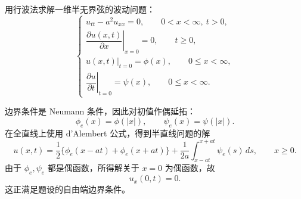 \begin{question}
用行波法求解一维半无界弦的波动问题：
\[
\begin{cases}
u_{tt}-a^2u_{xx}=0,\qquad 0<x<\infty,\ t>0,\\
\left.\dfrac{\partial u(x,t)}{\partial x}\right|_{x=0}=0,\qquad t\ge0,\\
u(x,t)|_{t=0}=\phi(x),\qquad 0\le x<\infty,\\
\left.\dfrac{\partial u}{\partial t}\right|_{t=0}=\psi(x),\qquad 0\le x<\infty.
\end{cases}
\]
\begin{solution}
边界条件是 Neumann 条件，因此对初值作偶延拓：
\[
\phi_e(x)=\phi(|x|),\qquad \psi_e(x)=\psi(|x|).
\]
在全直线上使用 d'Alembert 公式，得到半直线问题的解
\[
u(x,t)=\frac12\{\phi_e(x-at)+\phi_e(x+at)\}
+\frac{1}{2a}\int_{x-at}^{x+at}\psi_e(s)\,ds,
\qquad x\ge0.
\]
由于 \(\phi_e,\psi_e\) 都是偶函数，所得解关于 \(x=0\) 为偶函数，故
\[
u_x(0,t)=0.
\]
这正满足题设的自由端边界条件。
\end{solution}
\end{question}

